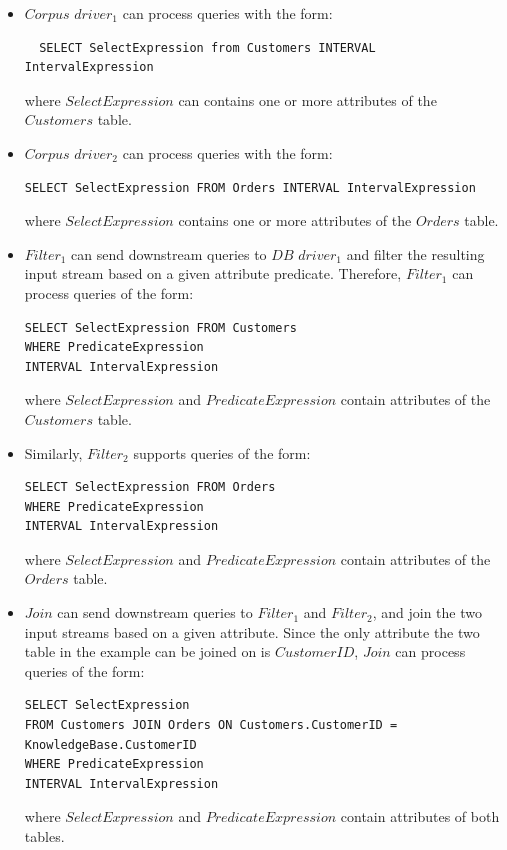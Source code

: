\begin{itemize}
  \item $Corpus$ $driver_1$ can process queries with the form:
  \begin{lstlisting}
  SELECT SelectExpression from Customers INTERVAL IntervalExpression
  \end{lstlisting}
  where $SelectExpression$ can contains one or more attributes of the $Customers$ table.

\item $Corpus$ $driver_2$ can process queries with the form:
\begin{lstlisting}
SELECT SelectExpression FROM Orders INTERVAL IntervalExpression
\end{lstlisting}
where $SelectExpression$ contains one or more attributes of the $Orders$ table.

\item $Filter_1$ can send downstream queries to $DB$ $driver_1$ and filter the resulting input stream based on a given
attribute predicate.
Therefore, $Filter_1$ can process queries of the form:
\begin{lstlisting}
SELECT SelectExpression FROM Customers
WHERE PredicateExpression
INTERVAL IntervalExpression
\end{lstlisting}
where $SelectExpression$ and $PredicateExpression$ contain attributes of the $Customers$ table.

\item Similarly, $Filter_2$ supports queries of the form:
\begin{lstlisting}
SELECT SelectExpression FROM Orders
WHERE PredicateExpression
INTERVAL IntervalExpression
\end{lstlisting}
where $SelectExpression$ and $PredicateExpression$ contain attributes of the $Orders$ table.

\item $Join$ can send downstream queries to $Filter_1$ and $Filter_2$,
and join the two input streams based on a given attribute.
Since the only attribute the two table in the example can be joined on is $CustomerID$,
$Join$ can process queries of the form:
\begin{lstlisting}
SELECT SelectExpression
FROM Customers JOIN Orders ON Customers.CustomerID = KnowledgeBase.CustomerID
WHERE PredicateExpression
INTERVAL IntervalExpression
\end{lstlisting}
where $SelectExpression$ and $PredicateExpression$ contain attributes of both tables.

\end{itemize}

